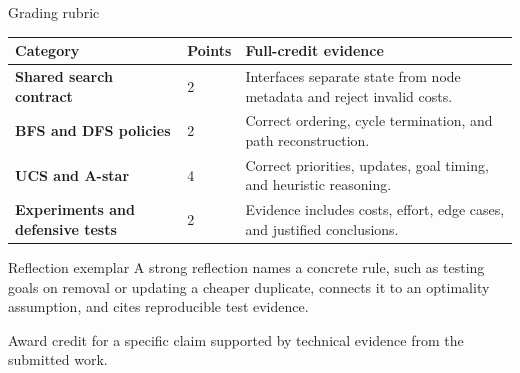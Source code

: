 \documentclass[aspectratio=169,11pt]{beamer}
\begin{document}
\begin{frame}{Grading rubric}
\scriptsize
\begin{tabularx}{\textwidth}{>{\bfseries}p{} p{} X}
\toprule
Category & Points & Full-credit evidence \\
\midrule
Shared search contract & 2 & Interfaces separate state from node metadata and reject invalid costs. \\
BFS and DFS policies & 2 & Correct ordering, cycle termination, and path reconstruction. \\
UCS and A-star & 4 & Correct priorities, updates, goal timing, and heuristic reasoning. \\
Experiments and defensive tests & 2 & Evidence includes costs, effort, edge cases, and justified conclusions. \\
\bottomrule
\end{tabularx}
\end{frame}

\begin{frame}{Reflection exemplar}
\small
\answerlabel A strong reflection names a concrete rule, such as testing goals on removal or updating a cheaper duplicate, connects it to an optimality assumption, and cites reproducible test evidence.

\vspace{0.25cm}
\gradinglabel Award credit for a specific claim supported by technical evidence from the submitted work.
\end{frame}
\end{document}
